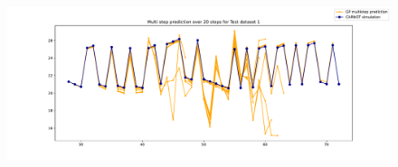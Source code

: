 \begin{figure}[ht]
    \centering
    \includegraphics[width =
    \textwidth]{Plots/GP_313_-1pts_test_prediction_20_steps.pdf}
    \caption{}
    \label{fig:GP_313_multistep_validation}
\end{figure}


\clearpage
